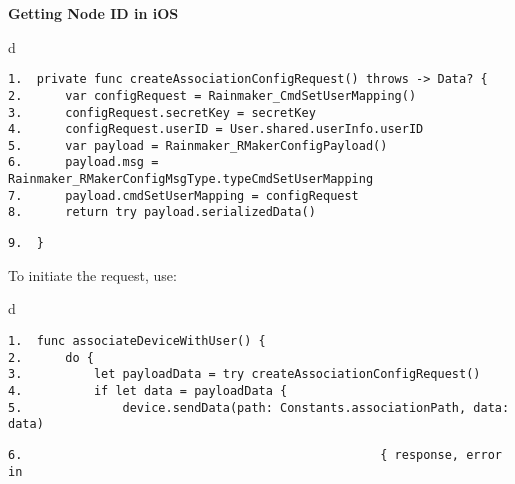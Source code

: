 \documentclass[a4paper,12pt]{book}
\begin{document}
\textbf{Getting Node ID in iOS}


\begin{codebloc}
\begin{tabular}{d}
\vspace{2pt}
\begin{verbatim}
1.  private func createAssociationConfigRequest() throws -> Data? {
2.      var configRequest = Rainmaker_CmdSetUserMapping()
3.      configRequest.secretKey = secretKey
4.      configRequest.userID = User.shared.userInfo.userID
5.      var payload = Rainmaker_RMakerConfigPayload()
6.      payload.msg = Rainmaker_RMakerConfigMsgType.typeCmdSetUserMapping
7.      payload.cmdSetUserMapping = configRequest
8.      return try payload.serializedData()
\end{verbatim}
\verb|9.  }|
\end{tabular}
\end{codebloc}

To initiate the request, use:

\begin{codebloc}
\begin{tabular}{d}
\vspace{2pt}
\begin{verbatim}
1.  func associateDeviceWithUser() {
2.      do {
3.          let payloadData = try createAssociationConfigRequest()
4.          if let data = payloadData {
5.              device.sendData(path: Constants.associationPath, data: data)
\end{verbatim}
\verb|6.                                                  { response, error in|
\end{tabular}
\end{codebloc}
\end{document}
